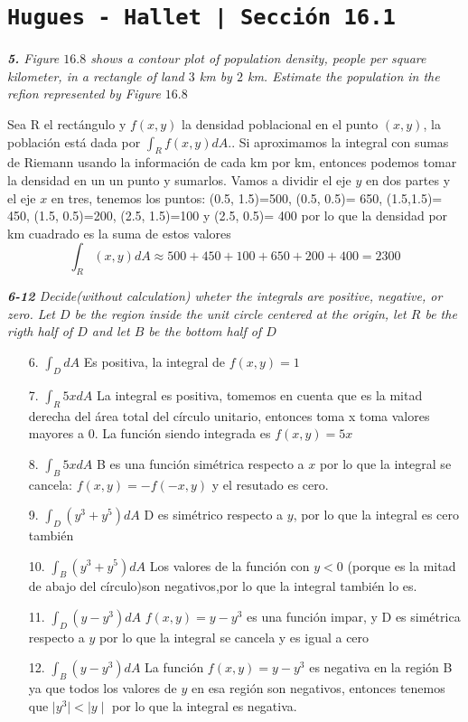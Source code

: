 \documentclass[a4paper,12pt]{article}
\begin{document}
\section{\texttt{Hugues - Hallet | Sección 16.1}}
\textit{\textbf{5.} Figure $16.8$ shows a contour plot of population density, people per square kilometer, in a rectangle of land $3$ km by $2$ km. Estimate the population in the refion represented by Figure $16.8$}

Sea R el rectángulo y $f(x,y)$ la densidad poblacional en el punto $(x,y)$, la población está dada por $\int_{R}f(x,y)dA$.. Si aproximamos la integral con sumas de Riemann usando la información de cada km por km, entonces podemos tomar la densidad en un un punto y sumarlos. 
Vamos a dividir el eje $y$ en dos partes y el eje $x$ en tres, tenemos los puntos: 
(0.5, 1.5)=500, (0.5, 0.5)= 650, (1.5,1.5)= 450, (1.5, 0.5)=200, (2.5, 1.5)=100 y (2.5, 0.5)= 400
por lo que la densidad por km cuadrado es la suma de estos valores
\[\int_{R}(x,y)dA\approx 500 + 450 + 100 + 650 + 200 + 400 = 2300\]

\textit{\textbf{6-12} Decide(without calculation) wheter the integrals are positive, negative, or zero. Let $D$ be the region inside the unit circle centered at the origin, let $R$ be the rigth half of $D$ and let $B$ be the bottom half of $D$}
\begin{itemize}
	\item[6.]$\int_{D}dA$
	         Es positiva, la integral de $f(x,y) = 1$
	\item[7.]$\int_{R}5xdA$
			  La integral es positiva, tomemos en cuenta que es la mitad derecha del área total del círculo unitario, entonces toma x toma valores mayores a $0$. La función siendo integrada es $f(x,y) = 5x$
	\item[8.]$\int_{B}5xdA$
			  B es una función simétrica respecto a $x$ por lo que la integral se cancela: $f(x,y) = -f (-x,y)$ y el resutado es cero.
	\item[9.]$\int_{D}(y^3 + y^5)dA$
		  	   D es simétrico respecto a $y$, por lo que la integral es cero también
	\item[10.]$\int_{B}(y^3+y^5)dA$
			   Los valores de la función con $y < 0$ (porque es la mitad de abajo del círculo)son negativos,por lo que la integral también lo es.
	\item[11.]$\int_{D}(y-y^3)dA$
				$f(x,y) = y- y^3$ es una función impar, y D es simétrica respecto a $y$ por lo que la integral se cancela y es igual a cero
	\item[12.]$\int_{B}(y-y^3)dA$	
			 La función $f(x,y) = y -y^3$ es negativa en la región B ya que todos los valores de $y$ en esa región son negativos, entonces tenemos que $\mid y^3 \mid < \mid y \mid$ por lo que la integral es negativa. 
\end{itemize}
\end{document}
